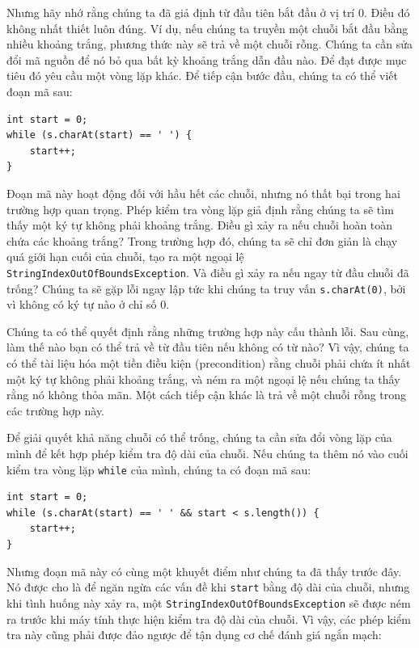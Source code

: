 Nhưng hãy nhớ rằng chúng ta đã giả định từ đầu tiên bắt đầu ở vị trí 0. Điều đó không nhất thiết luôn đúng. Ví dụ, nếu chúng ta truyền một chuỗi bắt đầu bằng nhiều khoảng trắng, phương thức này sẽ trả về một chuỗi rỗng. Chúng ta cần sửa đổi mã nguồn để nó bỏ qua bất kỳ khoảng trắng dẫn đầu nào. Để đạt được mục tiêu đó yêu cầu một vòng lặp khác. Để tiếp cận bước đầu, chúng ta có thể viết đoạn mã sau:

\begin{verbatim}
int start = 0;
while (s.charAt(start) == ' ') {
    start++;
}
\end{verbatim}

Đoạn mã này hoạt động đối với hầu hết các chuỗi, nhưng nó thất bại trong hai trường hợp quan trọng. Phép kiểm tra vòng lặp giả định rằng chúng ta sẽ tìm thấy một ký tự không phải khoảng trắng. Điều gì xảy ra nếu chuỗi hoàn toàn chứa các khoảng trắng? Trong trường hợp đó, chúng ta sẽ chỉ đơn giản là chạy quá giới hạn cuối của chuỗi, tạo ra một ngoại lệ \texttt{StringIndex\allowbreak{}OutOfBounds\allowbreak{}Exception}. Và điều gì xảy ra nếu ngay từ đầu chuỗi đã trống? Chúng ta sẽ gặp lỗi ngay lập tức khi chúng ta truy vấn \texttt{s.charAt(0)}, bởi vì không có ký tự nào ở chỉ số 0.

Chúng ta có thể quyết định rằng những trường hợp này cấu thành lỗi. Sau cùng, làm thế nào bạn có thể trả về từ đầu tiên nếu không có từ nào? Vì vậy, chúng ta có thể tài liệu hóa một tiền điều kiện (precondition) rằng chuỗi phải chứa ít nhất một ký tự không phải khoảng trắng, và ném ra một ngoại lệ nếu chúng ta thấy rằng nó không thỏa mãn. Một cách tiếp cận khác là trả về một chuỗi rỗng trong các trường hợp này.

Để giải quyết khả năng chuỗi có thể trống, chúng ta cần sửa đổi vòng lặp của mình để kết hợp phép kiểm tra độ dài của chuỗi. Nếu chúng ta thêm nó vào cuối kiểm tra vòng lặp \texttt{while} của mình, chúng ta có đoạn mã sau:

\begin{verbatim}
int start = 0;
while (s.charAt(start) == ' ' && start < s.length()) {
    start++;
}
\end{verbatim}

Nhưng đoạn mã này có cùng một khuyết điểm như chúng ta đã thấy trước đây. Nó được cho là để ngăn ngừa các vấn đề khi \texttt{start} bằng độ dài của chuỗi, nhưng khi tình huống này xảy ra, một \texttt{StringIndex\allowbreak{}OutOfBounds\allowbreak{}Exception} sẽ được ném ra trước khi máy tính thực hiện kiểm tra độ dài của chuỗi. Vì vậy, các phép kiểm tra này cũng phải được đảo ngược để tận dụng cơ chế đánh giá ngắn mạch:

